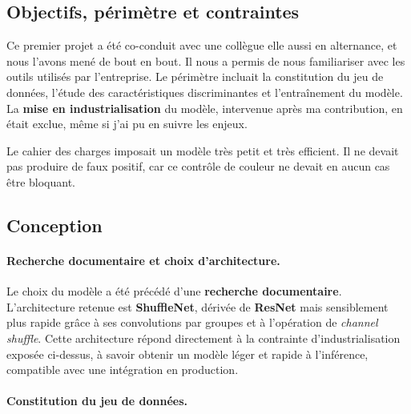 \subsection{Objectifs, périmètre et contraintes}

Ce premier projet a été co-conduit avec une collègue elle aussi en alternance, et nous
l'avons mené de bout en bout. Il nous a permis de nous familiariser avec les outils
utilisés par l'entreprise. Le périmètre incluait la constitution du jeu de données,
l'étude des caractéristiques discriminantes et l'entraînement du modèle. La
\textbf{mise en industrialisation} du modèle, intervenue après ma contribution, en
était exclue, même si j'ai pu en suivre les enjeux.

Le cahier des charges imposait un modèle très petit et très efficient. Il ne devait
pas produire de faux positif, car ce contrôle de couleur ne devait en aucun cas être
bloquant.

\subsection{Conception}

\paragraph{Recherche documentaire et choix d'architecture.}
Le choix du modèle a été précédé d'une \textbf{recherche documentaire}. L'architecture
retenue est \textbf{ShuffleNet}, dérivée de \textbf{ResNet} mais sensiblement plus
rapide grâce à ses convolutions par groupes et à l'opération de \emph{channel
shuffle}. Cette architecture répond directement à la contrainte d'industrialisation
exposée ci-dessus, à savoir obtenir un modèle léger et rapide à l'inférence,
compatible avec une intégration en production.

\paragraph{Constitution du jeu de données.}

